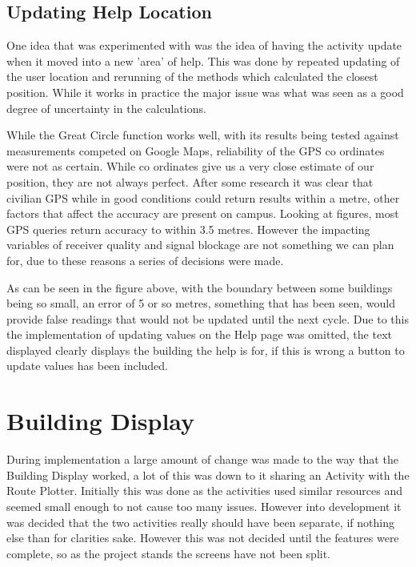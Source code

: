 \subsection{Updating Help Location}
One idea that was experimented with was the idea of having the activity update when it moved into a new 'area' of help. This was done by repeated updating of the user location and rerunning of the methods which calculated the closest position. While it works in practice the major issue was what was seen as a good degree of uncertainty in the calculations.

While the Great Circle function works well, with its results being tested against measurements competed on Google Maps, reliability of the GPS co ordinates were not as certain. While co ordinates give us a very close estimate of our position, they are not always perfect. After some research it was clear that civilian GPS while in good conditions could return results within a metre\cite{gps}, other factors that affect the accuracy are present on campus. Looking at figures, most GPS queries return accuracy to within 3.5 metres\cite{accuracy}. However the impacting variables of receiver quality and signal blockage are not something we can plan for, due to these reasons a series of decisions were made.

As can be seen in the figure above, with the boundary between some buildings being so small, an error of 5 or so metres, something that has been seen, would provide false readings that would not be updated until the next cycle. Due to this the implementation of updating values on the Help page was omitted, the text displayed clearly displays the building the help is for, if this is wrong  a button to update values has been included.  

\section{Building Display}
During implementation a large amount of change was made to the way that the Building Display worked, a lot of this was down to it sharing an Activity with the Route Plotter. Initially this was done as the activities used similar resources and seemed small enough to not cause too many issues. However into development it was decided that the two activities really should have been separate, if nothing else than for clarities sake. However this was not decided until the features were complete, so as the project stands the screens have not been split. 
